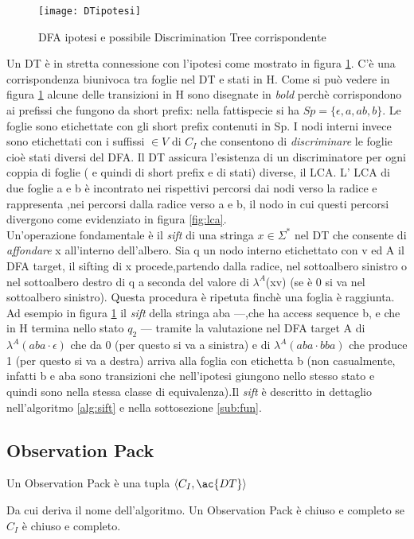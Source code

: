 \begin{figure}[htp]
	\centering
	\texttt{[image: DTipotesi]}
	\caption[Correlazione tra ipotesi e discrimination tree]{DFA ipotesi e possibile Discrimination Tree corrispondente}
   \label{fig:hdt}
\end{figure}
Un \ac{DT} è in stretta connessione con l'ipotesi come mostrato in figura \ref{fig:hdt}. C'è una corrispondenza biunivoca tra foglie nel \ac{DT} e stati in \ac{H}. Come si può vedere in figura  \ref{fig:hdt} alcune delle transizioni in \ac{H} sono disegnate in \textit{bold} perchè corrispondono ai prefissi che fungono da short prefix: nella fattispecie si ha $Sp=\{\epsilon,a,ab,b\}$. Le foglie sono etichettate con gli short prefix contenuti in Sp. I nodi interni invece sono etichettati con i suffissi $\in V \text{ di } C_I$ che consentono di \textit{discriminare} le foglie cioè stati diversi del \ac{DFA}. Il \ac{DT} assicura l'esistenza di un discriminatore per ogni coppia di foglie ( e quindi di short prefix e di stati) diverse, il \ac{LCA}. L' \ac{LCA} di due foglie a e b è incontrato nei rispettivi percorsi dai nodi verso la radice e rappresenta ,nei percorsi dalla radice verso a e b, il nodo in cui questi percorsi divergono come evidenziato in figura \ref{fig:lca}.\\Un'operazione fondamentale è il \textit{sift} di una stringa $x \in \Sigma^{*}$ nel \ac{DT} che consente di \textit{affondare} x all'interno dell'albero. Sia q un nodo interno etichettato con v ed A il \ac{DFA} target, il sifting di x  procede,partendo dalla radice, nel sottoalbero sinistro o nel sottoalbero destro di q a seconda del valore di $\lambda^{A}$(xv) (se è 0 si va nel sottoalbero sinistro). Questa procedura è ripetuta finchè una foglia è raggiunta. Ad esempio in figura \ref{fig:hdt} il \textit{sift} della stringa aba ---,che ha access sequence b, e che in \ac{H} termina nello stato $q_2$ --- tramite la valutazione nel \ac{DFA} target A di $\lambda^{A}(aba \cdot \epsilon)$ che da 0 (per questo si va a sinistra) e di $\lambda^{A}(aba \cdot bba)$ che produce 1 (per questo si va a destra)  arriva alla foglia con etichetta b (non casualmente, infatti b e aba sono transizioni che  nell'ipotesi giungono nello stesso stato e quindi sono nella stessa classe di equivalenza).Il \textit{sift} è descritto in dettaglio nell'algoritmo \ref{alg:sift} e nella sottosezione \ref{sub:fun}.
\subsection{Observation Pack}
\begin{definizione*}
Un Observation Pack è una tupla $\Braket{C_{I} , \ac{DT}}$
\end{definizione*}
Da cui deriva il nome dell'algoritmo. Un Observation Pack è chiuso e completo se $C_I$ è chiuso e completo.

